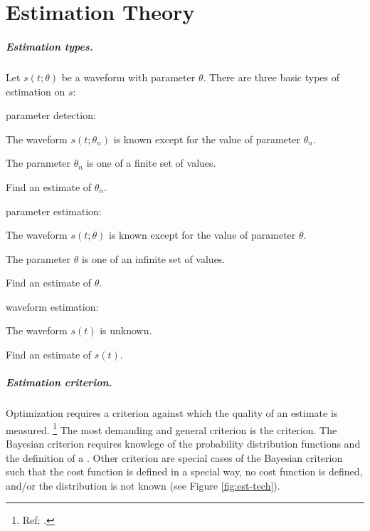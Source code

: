
\chapter{Estimation Theory }
\label{app:est}
\paragraph{Estimation types.}
Let $s(t;\theta)$ be a waveform with parameter $\theta$.
There are three basic types of estimation on $s$:

\begin{enume}
   \item parameter detection:
      \begin{liste}
         \item The waveform $s(t;\theta_n)$ is known except for the value of parameter $\theta_n$.
         \item The parameter $\theta_n$ is one of a finite set of values.
         \item Find an estimate of $\theta_n$.
      \end{liste}
   \item parameter estimation:
      \begin{liste}
         \item The waveform $s(t;\theta)$ is known except for the value of parameter $\theta$.
         \item The parameter $\theta$ is one of an infinite set of values.
         \item Find an estimate of $\theta$.
      \end{liste}
   \item waveform estimation:
      \begin{liste}
         \item The waveform $s(t)$ is unknown.
         \item Find an estimate of $s(t)$.
      \end{liste}
\end{enume}

\paragraph{Estimation criterion.}
Optimization requires a criterion against which the quality of an
estimate is measured.
\footnote{Ref: .}
The most demanding and general criterion is the  criterion.
The Bayesian criterion requires knowlege of the probability
distribution functions and the definition of a .
Other criterion are special cases of the Bayesian criterion
such that the cost function is defined in a special way,
no cost function is defined, and/or the distribution is not known
(see Figure \ref{fig:est-tech}).

